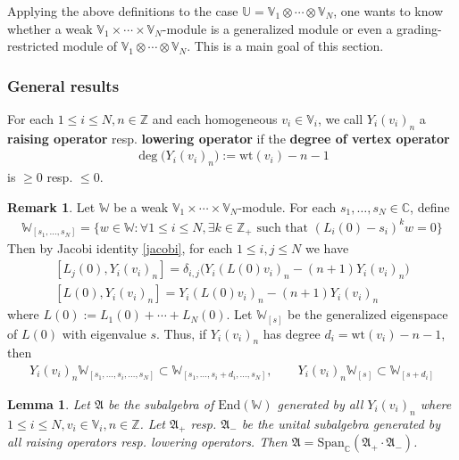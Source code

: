 \documentclass[11pt,b5paper,notitlepage]{article}
\theoremstyle{definition}
\newtheorem{rem}[df]{Remark}
\theoremstyle{plain}
\newtheorem{lm}[df]{Lemma}
\newcommand{\fk}{\mathfrak}
\newcommand{\End}{\mathrm{End}} %
\newcommand{\Span}{\mathrm{Span}}
\newcommand{\Vbb}{\mathbb V}
\newcommand{\Ubb}{\mathbb U}
\newcommand{\Wbb}{\mathbb W}
\newcommand{\Cbb}{\mathbb C}
\newcommand{\Zbb}{\mathbb Z}
\newcommand{\wt}{\mathrm{wt}}
\newcommand{\<}{\left\langle}
\renewcommand{\>}{\right\rangle}
\numberwithin{equation}{subsection}
\begin{document}
Applying the above definitions to the case $\Ubb=\Vbb_1\otimes\cdots\otimes\Vbb_N$, one wants to know whether a weak $\Vbb_1\times\cdots\times\Vbb_N$-module is a generalized module or even a grading-restricted module of $\Vbb_1\otimes\cdots\otimes\Vbb_N$. This is a main goal of this section. 



\subsubsection{General results}

For each $1\leq i\leq N,n\in\Zbb$ and each homogeneous $v_i\in\Vbb_i$, we call $Y_i(v_i)_n$ a \textbf{raising operator} resp. \textbf{lowering operator} if the \textbf{degree of vertex operator}
\begin{align}
\deg\big(Y_i(v_i)_n\big):= \wt(v_i)-n-1
\end{align}
is $\geq0$ resp. $\leq 0$. 

\begin{rem}
Let $\Wbb$ be a weak $\Vbb_1\times\cdots\times\Vbb_N$-module. For each $s_1,\dots,s_N\in\Cbb$, define \index{Wn@$\Wbb_{[n]},\Wbb_{[n_1,\dots,n_N]}$}
\begin{align}
\Wbb_{[s_1,\dots,s_N]}=\{w\in\Wbb:\forall 1\leq i\leq N, \exists k\in\Zbb_+\text{ such that }(L_i(0)-s_i)^kw=0\}
\end{align}
Then by Jacobi identity \eqref{jacobi}, for each $1\leq i,j\leq N$ we have
\begin{subequations}\label{eq157}
\begin{gather}
[L_j(0),Y_i(v_i)_n]=\delta_{i,j}(Y_i(L(0)v_i)_n-(n+1)Y_i(v_i)_n\big)  \label{eq140} \\
[L(0),Y_i(v_i)_n]=Y_i(L(0)v_i)_n-(n+1)Y_i(v_i)_n
\end{gather}
\end{subequations}
where $L(0):=L_1(0)+\cdots+L_N(0)$. Let $\Wbb_{[s]}$ be the generalized eigenspace of $L(0)$ with eigenvalue $s$. Thus, if $Y_i(v_i)_n$ has degree $d_i=\wt(v_i)-n-1$, then
\begin{gather}
Y_i(v_i)_n \Wbb_{[s_1,\dots,s_i,\dots,s_N]}\subset\Wbb_{[s_1,\dots,s_i+d_i,\dots,s_N]}, \qquad
Y_i(v_i)_n \Wbb_{[s]}\subset\Wbb_{[s+d_i]}  \label{eq112}
\end{gather}
\end{rem}



\begin{lm}\label{lb36}
Let $\fk A$ be the subalgebra of $\End(\Wbb)$ generated by all $Y_i(v_i)_n$ where $1\leq i\leq N,v_i\in\Vbb_i,n\in\Zbb$. Let $\fk A_+$ resp. $\fk A_-$ be the unital subalgebra generated by all raising operators resp. lowering operators. Then $\fk A=\Span_\Cbb(\fk A_+\cdot\fk A_-)$. 
\end{lm}
\end{document}

